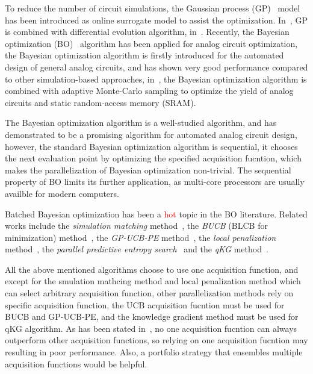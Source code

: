 %
To reduce the number of circuit simulations, the Gaussian process
(GP)~\cite{GPML} model has been introduced as online surrogate model to assist
the optimization. In~\cite{liu2014gaspad}, GP is combined with differential
evolution algorithm, in~\cite{lyu2017efficient}. Recently, the Bayesian
optimization (BO)~\cite{shahriari2016taking} algorithm has been applied for
analog circuit optimization, the Bayesian optimization algorithm is firstly
introduced for the automated design of general analog circuits, and has shown
very good performance compared to other simulation-based approaches,
in~\cite{wang2017efficient}, the Bayesian optimization algorithm is combined
with adaptive Monte-Carlo sampling to optimize the yield of analog circuits and
static random-access memory (SRAM).

The Bayesian optimization algorithm is a well-studied algorithm, and has
demonstrated to be a promising algorithm for automated analog circuit design,
however, the standard Bayesian optimization algorithm is sequential, it chooses
the next evaluation point by optimizing the specified acquisition fucntion,
which makes the parallelization of Bayesian optimization non-trivial. The
sequential property of BO limits its further application, as multi-core
processors are usually availble for modern computers. 

Batched Bayesian optimization has been a \textcolor{red}{hot} topic in the BO
literature. Related works include the \emph{simulation matching}
method~\cite{azimi2010batch}, the \emph{BUCB} (BLCB for minimization)
method~\cite{desautels2014parallelizing}, the \emph{GP-UCB-PE}
method~\cite{contal2013parallel}, the \emph{local penalization}
method~\cite{gonzalez2016batch}, the \emph{parallel predictive entropy
search}~\cite{shah2015parallel} and the \emph{qKG}
method~\cite{wu2016parallel}.


All the above mentioned algorithms choose to use one acquisition function, and
except for the smulation mathcing method and local penalization method which
can select arbitrary acquisition function, other parallelization methods rely on
specific acquisition function, the UCB acquisition fucntion must be used for
BUCB and GP-UCB-PE, and the knowledge gradient method must be used for qKG
algorithm. As has been stated in~\cite{hoffman2011portfolio}, no one
acquisition fucntion can always outperform other acquisition functions, so
relying on one acquisition fucntion may resulting in poor performance. Also, a
portfolio strategy that ensembles multiple acquisition functions would be
helpful.

